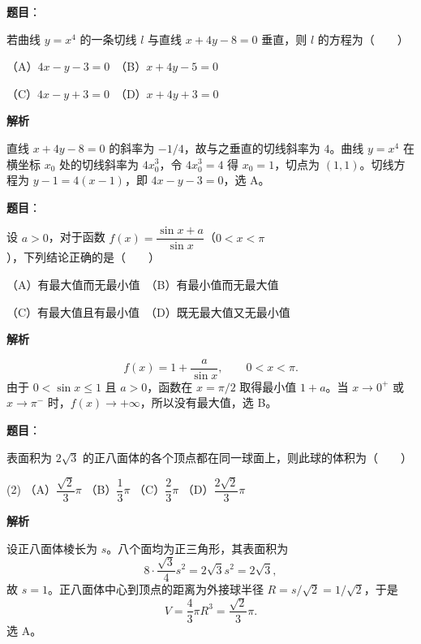 \begin{answer}

\textbf{题目}：

若曲线 $y=x^4$ 的一条切线 $l$ 与直线 $x+4y-8=0$ 垂直，则 $l$ 的方程为\mbox{（　　）}

（A）$4x-y-3=0$　（B）$x+4y-5=0$

（C）$4x-y+3=0$　（D）$x+4y+3=0$

\textbf{解析}

直线 $x+4y-8=0$ 的斜率为 $-1/4$，故与之垂直的切线斜率为 $4$。曲线 $y=x^4$ 在横坐标 $x_0$ 处的切线斜率为 $4x_0^3$，令 $4x_0^3=4$ 得 $x_0=1$，切点为 $(1,1)$。切线方程为 $y-1=4(x-1)$，即 $4x-y-3=0$，选 A。


\end{answer}
\begin{answer}

\textbf{题目}：

设 $a>0$，对于函数 $f(x)=\dfrac{\sin x+a}{\sin x}$（$0<x<\pi$），下列结论正确的是\mbox{（　　）}

（A）有最大值而无最小值　（B）有最小值而无最大值

（C）有最大值且有最小值　（D）既无最大值又无最小值

\textbf{解析}

\nopagebreak[4]
\[
f(x)=1+\frac{a}{\sin x},\qquad 0<x<\pi.
\]
由于 $0<\sin x\le1$ 且 $a>0$，函数在 $x=\pi/2$ 取得最小值 $1+a$。当 $x\to0^+$ 或 $x\to\pi^-$ 时，$f(x)\to+\infty$，所以没有最大值，选 B。


\end{answer}
\begin{answer}

\textbf{题目}：

表面积为 $2\sqrt{3}$ 的正八面体的各个顶点都在同一球面上，则此球的体积为\mbox{（　　）}

\begin{gkopts}(2)
\task （A）$\dfrac{\sqrt{2}}{3}\pi$
\task （B）$\dfrac{1}{3}\pi$
\task （C）$\dfrac{2}{3}\pi$
\task （D）$\dfrac{2\sqrt{2}}{3}\pi$
\end{gkopts}

\textbf{解析}

设正八面体棱长为 $s$。八个面均为正三角形，其表面积为
\nopagebreak[4]
\[
8\cdot\frac{\sqrt3}{4}s^2=2\sqrt3s^2=2\sqrt3,
\]
故 $s=1$。正八面体中心到顶点的距离为外接球半径 $R=s/\sqrt2=1/\sqrt2$，于是
\nopagebreak[4]
\[
V=\frac43\pi R^3=\frac{\sqrt2}{3}\pi.
\]
选 A。


\end{answer}
